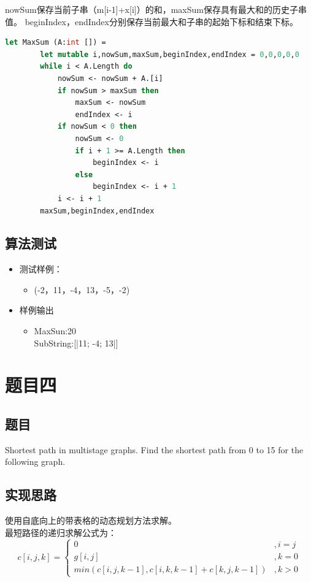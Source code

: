 \documentclass[a4paper]{article}
\begin{document}
nowSum保存当前子串（m[i-1]+x[i]）的和，maxSum保存具有最大和的历史子串值。
beginIndex，endIndex分别保存当前最大和子串的起始下标和结束下标。

\begin{lstlisting}[language=ML]
    let MaxSum (A:int []) =
        let mutable i,nowSum,maxSum,beginIndex,endIndex = 0,0,0,0,0
        while i < A.Length do
            nowSum <- nowSum + A.[i]
            if nowSum > maxSum then
                maxSum <- nowSum
                endIndex <- i
            if nowSum < 0 then
                nowSum <- 0
                if i + 1 >= A.Length then
                    beginIndex <- i
                else
                    beginIndex <- i + 1
            i <- i + 1
        maxSum,beginIndex,endIndex
\end{lstlisting}

\subsection{算法测试}

\begin{itemize}
\item
    测试样例：
    \begin{itemize}
    \item
        (-2，11，-4，13，-5，-2)
    \end{itemize}
\item
    样例输出
    \begin{itemize}
    \item
        MaxSun:20 \\
        SubString:[|11; -4; 13|]
    \end{itemize}
\end{itemize}
\section{题目四}

\subsection{题目}

Shortest path in multistage graphs. Find the shortest path from 0 to 15 for the following graph.

\subsection{实现思路}
使用自底向上的带表格的动态规划方法求解。\\
最短路径的递归求解公式为：
\[c[i,j,k]=
    \left\{
        \begin{array}{ll}
            0 & ,i=j\\
            g[i,j] & ,k=0\\
            min(c[i,j,k-1],c[i,k,k-1]+c[k,j,k-1]) & ,k>0
        \end{array}
    \right.
\]
\end{document}
